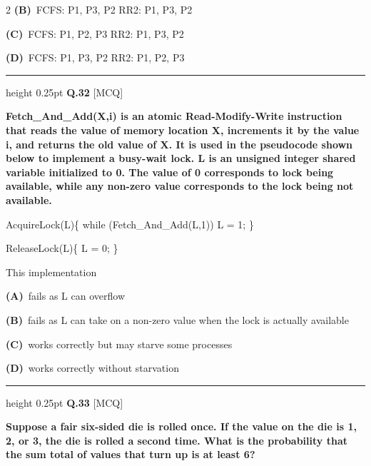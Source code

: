 \documentclass[a4paper,10pt,twoside]{article}
\begin{document}
\begin{multicols}{2}
\textbf{(B)}~FCFS: P1, P3, P2 RR2: P1, P3, P2\par\vspace{2pt}\noindent
\textbf{(C)}~FCFS: P1, P2, P3 RR2: P1, P3, P2\par\vspace{2pt}\noindent
\textbf{(D)}~FCFS: P1, P3, P2 RR2: P1, P2, P3
\par\vspace{6pt}\hrule height 0.25pt\vspace{6pt}
\noindent\textbf{Q.32} \hfill {\footnotesize\textsf{[MCQ]}}
\par\vspace{2pt}
{\bfseries Fetch\_And\_Add(X,i) is an atomic Read-Modify-Write instruction that reads the value of
memory location X, increments it by the value i, and returns the old value of X. It is used in the
pseudocode shown below to implement a busy-wait lock. L is an unsigned integer shared variable
initialized to 0. The value of 0 corresponds to lock being available, while any non-zero value
corresponds to the lock being not available.
\par\smallskip
AcquireLock(L)\{
while (Fetch\_And\_Add(L,1))
L = 1;
\}
\par\smallskip
ReleaseLock(L)\{
L = 0;
\}
\par\smallskip
This implementation \par}
\par\vspace{2pt}\noindent
\textbf{(A)}~fails as L can overflow\par\vspace{2pt}\noindent
\textbf{(B)}~fails as L can take on a non-zero value when the lock is actually available\par\vspace{2pt}\noindent
\textbf{(C)}~works correctly but may starve some processes\par\vspace{2pt}\noindent
\textbf{(D)}~works correctly without starvation
\par\vspace{6pt}\hrule height 0.25pt\vspace{6pt}
\noindent\textbf{Q.33} \hfill {\footnotesize\textsf{[MCQ]}}
\par\vspace{2pt}
{\bfseries Suppose a fair six-sided die is rolled once. If the value on the die is 1, 2, or 3, the die is rolled a
second time. What is the probability that the sum total of values that turn up is at least 6? \par}

\end{multicols}
\end{document}
